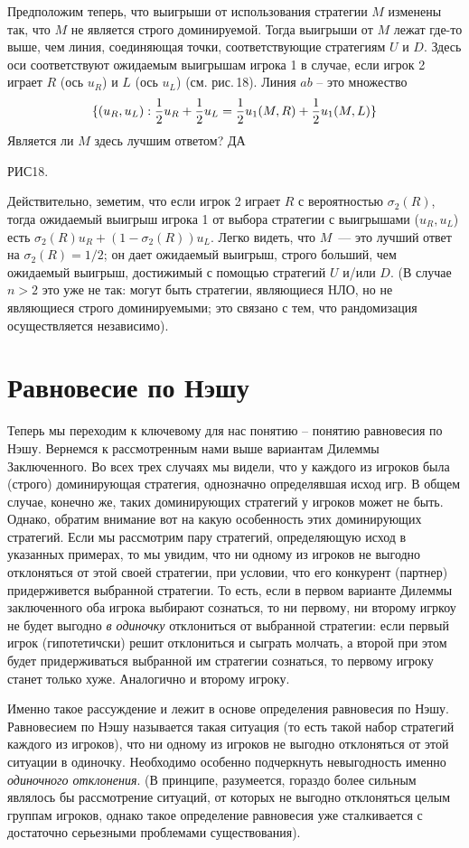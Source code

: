 \documentclass[12pt]{article}
\begin{document}
Предположим теперь, что выигрыши от использования стратегии $M$
изменены так, что $M$ не является строго доминируемой. Тогда
выигрыши от $M$ лежат где-то выше, чем линия, соединяющая точки,
соответствующие стратегиям $U$ и $D$. Здесь оси соответствуют
ожидаемым выигрышам игрока 1 в случае, если игрок 2 играет $R$ (ось
$u_R$) и $L$ (ось $u_L$) (см. рис.\,18). Линия $ab$ -- это множество
$$
\{(u_R,u_L):{1\over 2}u_R+{1\over 2}u_L= {1\over 2}u_1(M,R)+{1\over
2}u_1(M,L)\}
$$
Является ли $M$ здесь лучшим ответом? ДА


РИС18.


Действительно, земетим, что если игрок 2 играет $R$ с вероятностью
$\sigma_2(R)$, тогда ожидаемый выигрыш игрока 1 от выбора стратегии
с выигрышами ($u_R,u_L$) есть $\sigma_2(R)u_R+(1-\sigma_2(R))u_L$.
Легко видеть, что $M$~--- это лучший ответ на $\sigma_2(R)=1/2$; он
дает ожидаемый выигрыш, строго больший, чем ожидаемый выигрыш,
достижимый с помощью стратегий $U$ и/или $D$. (В случае $n>2$ это
уже не так: могут быть стратегии, являющиеся HЛО, но не являющиеся
строго доминируемыми; это связано с тем, что  рандомизация
осуществляется независимо).


\section{Равновесие по Нэшу}

Теперь мы переходим к ключевому для нас понятию -- понятию
равновесия по Нэшу. Вернемся к рассмотренным нами выше вариантам
Дилеммы Заключенного. Во всех трех случаях мы видели, что у каждого
из игроков была (строго) доминирующая стратегия, однозначно
определявшая исход игр. В общем случае, конечно же, таких
доминирующих стратегий у игроков может не быть. Однако, обратим
внимание вот на какую особенность этих доминирующих стратегий. Если
мы рассмотрим пару стратегий, определяющую исход в указанных
примерах, то мы увидим, что ни одному из игроков не выгодно
отклоняться от этой своей стратегии, при условии, что его конкурент
(партнер) придерживется выбранной стратегии. То есть, если в первом
варианте Дилеммы заключенного оба игрока выбирают сознаться, то ни
первому, ни второму игркоу не будет выгодно \emph{в одиночку}
отклониться от выбранной стратегии: если первый игрок (гипотетичски)
решит отклониться и сыграть молчать, а второй при этом будет
придерживаться выбранной им стратегии сознаться, то первому игроку
станет только хуже. Аналогично и второму игроку.

Именно такое рассуждение и лежит в основе определения равновесия по
Нэшу. Равновесием по Нэшу называется такая ситуация (то есть такой
набор стратегий каждого из игроков), что ни одному из игроков не
выгодно отклоняться от этой ситуации в одиночку. Необходимо особенно
подчеркнуть невыгодность именно \emph{одиночного отклонения}. (В
принципе, разумеется, гораздо более сильным являлось бы рассмотрение
ситуаций, от которых не выгодно отклоняться целым группам игроков,
однако такое определение равновесия уже сталкивается с достаточно
серьезными проблемами существования).
\end{document}
